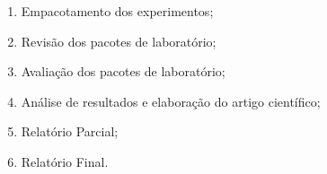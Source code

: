 \begin{enumerate}
\item Empacotamento dos experimentos;
\item Revisão dos pacotes de laboratório;
\item Avaliação dos pacotes de laboratório;
\item Análise de resultados e elaboração do artigo científico;
\item Relatório Parcial;
\item Relatório Final.
\end{enumerate}



